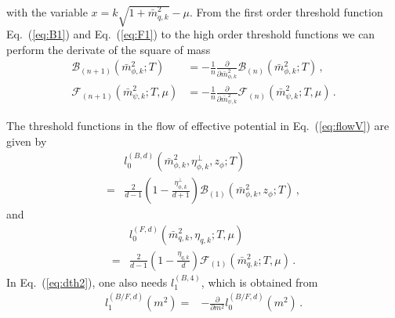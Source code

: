 \documentclass[%
reprint,
superscriptaddress,
showpacs,preprintnumbers,
 amsmath,amssymb,
 aps,
prd,
]{revtex4-1}
\def\Eq#1{Eq.~(\ref{#1})}
\begin{document}
with the variable $x=k\sqrt{1+\bar{m}^{2}_{q,k}}-\mu$. From the first order threshold function \Eq{eq:B1} and \Eq{eq:F1} to the high order threshold functions we can perform the derivate of the square of mass
\begin{align}
  \mathcal{B}_{(n+1)}(\bar{m}^{2}_{\phi,k};T)&=-\frac{1}{n}\frac{\partial}{\partial \bar{m}^{2}_{\phi,k}}\mathcal{B}_{(n)}(\bar{m}^{2}_{\phi,k};T)\,,\\[2ex]
  \mathcal{F}_{(n+1)}(\bar{m}^{2}_{\psi,k};T,\mu)&=-\frac{1}{n}\frac{\partial}{\partial \bar{m}^{2}_{\psi,k}}
                                    \mathcal{F}_{(n)}(\bar{m}^{2}_{\psi,k};T,\mu)\,. 
\end{align}

























The threshold functions in the flow of effective potential in \Eq{eq:flowV} are given by
\begin{align}
  &l_0^{(B,d)}(\bar{m}^{2}_{\phi,k},\eta^\perp_{\phi,k},z_\phi;T)\nonumber\\[2ex]
  =&\frac{2}{d-1}\left( 1- \frac{\eta^{\bot}_{\phi,k}}{d+1}\right)\mathcal{B}_{(1)}(\bar{m}^{2}_{\phi,k},z_\phi;T)\,,\label{eq:l0B}
\end{align} 
and
\begin{align}
  &l_0^{(F,d)}(\bar{m}^{2}_{q,k},\eta_{q,k};T,\mu)\nonumber\\[2ex]
  =&\frac{2}{d-1}\left( 1-\frac{\eta_{q,k}}{d} \right)\mathcal{F}_{(1)}(\bar{m}^{2}_{q,k};T,\mu)\,.\label{eq:l0F}
\end{align} 
In \Eq{eq:dth2}, one also needs $l^{(B,4)}_{1}$, which is obtained from 
\begin{align}
  l_1^{(B/F,d)}(m^{2})=&-\frac{\partial}{\partial m^{2}}l_0^{(B/F,d)}(m^{2})\,.\label{}
\end{align} 
\end{document}
